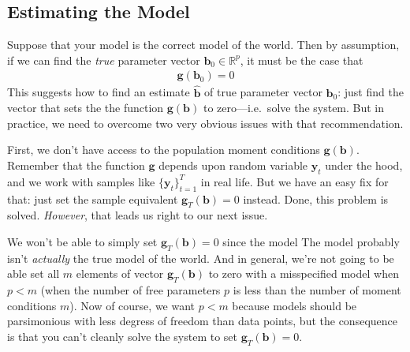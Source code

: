 \documentclass[12pt]{article}
\theoremstyle{plain}
\theoremstyle{definition}
\theoremstyle{remark}
\begin{document}
\clearpage
\subsection{Estimating the Model}

Suppose that your model is the correct model of the world. Then by
assumption, if we can find the \emph{true} parameter vector
$\boldsymbol{b}_0\in \mathbb{R}^p$, it must be the case that
\begin{align}
  \boldsymbol{g}(\boldsymbol{b}_0) = 0
  \label{eq:gmmtrue}
\end{align}
This suggests how to find an estimate $\boldsymbol{\hat{b}}$ of true
parameter vector $\boldsymbol{b}_0$: just find the vector that sets the
the function $\boldsymbol{g}(\boldsymbol{b})$ to zero---i.e.\ solve the
system.  But in practice, we need to overcome two very obvious issues
with that recommendation.

First, we don't have access to the population moment conditions
$\boldsymbol{g}(\boldsymbol{b})$. Remember that the function
$\boldsymbol{g}$ depends upon random variable $\boldsymbol{y}_t$ under
the hood, and we work with samples like $\{\boldsymbol{y}_t\}_{t=1}^T$
in real life.  But we have an easy fix for that: just set the sample
equivalent $\boldsymbol{g}_T(\boldsymbol{b})=0$ instead. Done, this
problem is solved.  \emph{However}, that leads us right to our next
issue.

We won't be able to simply set $\boldsymbol{g}_T(\boldsymbol{b})=0$
since the model The model probably isn't \emph{actually} the true model
of the world. And in general, we're not going to be able set all $m$
elements of vector $\boldsymbol{g}_T(\boldsymbol{b})$ to zero with a
misspecified model when $p<m$ (when the number of free parameters $p$ is
less than the number of moment conditions $m$).  Now of course, we want
$p<m$ because models should be parsimonious with less degress of freedom
than data points, but the consequence is that you can't cleanly solve
the system to set $\boldsymbol{g}_T(\boldsymbol{b})=0$.
\end{document}
